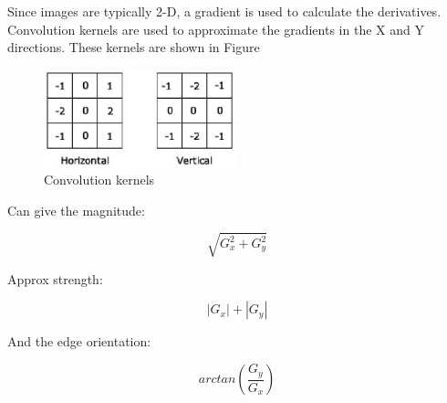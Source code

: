 Since images are typically 2-D, a gradient is used to calculate the derivatives. Convolution kernels are used to approximate the gradients in the X and Y directions. These kernels are shown in Figure

\begin{figure}[ht!]
{
\centering
\includegraphics[width=0.5\textwidth]{eps_pics/sobel-kernels1.eps}
\caption{Convolution kernels}
\label{fig:sobel_kernels1}
}
\end{figure}

Can give the  magnitude:

\begin{equation}
\sqrt{G_x^2 + G_y^2}
\end{equation}

Approx strength:

\begin{equation}
|G_x| + |G_y|
\end{equation}

And the edge orientation:

\begin{equation}
arctan(\frac{G_y}{G_x})
\end{equation}